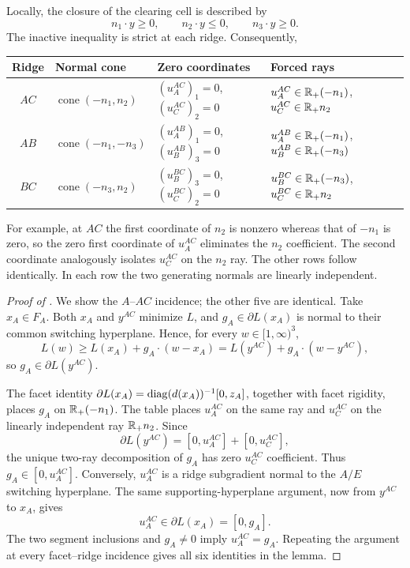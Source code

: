 Locally, the closure of the clearing cell is described by
\[
n_1\cdot y\ge0,\qquad n_2\cdot y\le0,\qquad n_3\cdot y\ge0.
\]
The inactive inequality is strict at each ridge. Consequently,
\begin{center}
\small
\begin{tabular}{@{}clll@{}}
\toprule
Ridge & Normal cone & Zero coordinates & Forced rays\\
\midrule
$AC$ & $\operatorname{cone}(-n_1,n_2)$
& $(u_A^{AC})_1=0$, $(u_C^{AC})_2=0$
& $u_A^{AC}\in\mathbb{R}_+(-n_1)$, $u_C^{AC}\in\mathbb{R}_+n_2$\\
$AB$ & $\operatorname{cone}(-n_1,-n_3)$
& $(u_A^{AB})_1=0$, $(u_B^{AB})_3=0$
& $u_A^{AB}\in\mathbb{R}_+(-n_1)$, $u_B^{AB}\in\mathbb{R}_+(-n_3)$\\
$BC$ & $\operatorname{cone}(-n_3,n_2)$
& $(u_B^{BC})_3=0$, $(u_C^{BC})_2=0$
& $u_B^{BC}\in\mathbb{R}_+(-n_3)$, $u_C^{BC}\in\mathbb{R}_+n_2$\\
\bottomrule
\end{tabular}
\end{center}
For example, at $AC$ the first coordinate of $n_2$ is nonzero whereas that of $-n_1$ is zero, so the zero first coordinate of $u_A^{AC}$ eliminates the $n_2$ coefficient. The second coordinate analogously isolates $u_C^{AC}$ on the $n_2$ ray. The other rows follow identically. In each row the two generating normals are linearly independent.

\begin{proof}[Proof of ]
We show the $A$--$AC$ incidence; the other five are identical. Take $x_A\in F_A$. Both $x_A$ and $y^{AC}$ minimize $L$, and $g_A\in\partial L(x_A)$ is normal to their common switching hyperplane. Hence, for every $w\in[1,\infty)^3$,
\[
L(w)\ge L(x_A)+g_A\cdot(w-x_A)
     =L(y^{AC})+g_A\cdot(w-y^{AC}),
\]
so $g_A\in\partial L(y^{AC})$.

The facet identity $\partial L(x_A)=\operatorname{diag}(d(x_A))^{-1}[0,z_A]$, together with facet rigidity, places $g_A$ on $\mathbb{R}_+(-n_1)$. The table places $u_A^{AC}$ on the same ray and $u_C^{AC}$ on the linearly independent ray $\mathbb{R}_+n_2$. Since
\[
\partial L(y^{AC})=[0,u_A^{AC}]+[0,u_C^{AC}],
\]
the unique two-ray decomposition of $g_A$ has zero $u_C^{AC}$ coefficient. Thus $g_A\in[0,u_A^{AC}]$. Conversely, $u_A^{AC}$ is a ridge subgradient normal to the $A/E$ switching hyperplane. The same supporting-hyperplane argument, now from $y^{AC}$ to $x_A$, gives
\[
u_A^{AC}\in\partial L(x_A)=[0,g_A].
\]
The two segment inclusions and $g_A\ne0$ imply $u_A^{AC}=g_A$. Repeating the argument at every facet--ridge incidence gives all six identities in the lemma.
\end{proof}

